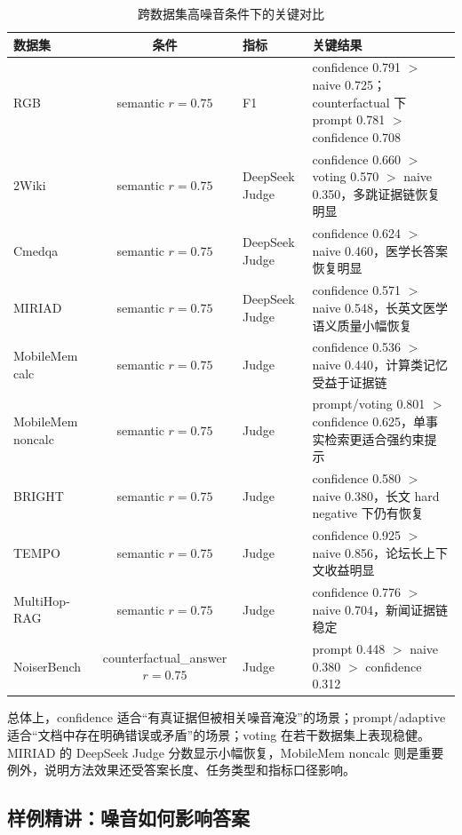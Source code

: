 \documentclass[UTF8,zihao=-4]{ctexart}
\begin{document}
\begin{table}[H]
  \centering
  \caption{跨数据集高噪音条件下的关键对比}
  \label{tab:cross_dataset_summary}
  \small
  \begin{tabularx}{\textwidth}{lclY}
    \toprule
    数据集 & 条件 & 指标 & 关键结果 \\
    \midrule
    RGB & semantic $r=0.75$ & F1 & confidence 0.791 $>$ naive 0.725；counterfactual 下 prompt 0.781 $>$ confidence 0.708 \\
    2Wiki & semantic $r=0.75$ & DeepSeek Judge & confidence 0.660 $>$ voting 0.570 $>$ naive 0.350，多跳证据链恢复明显 \\
    Cmedqa & semantic $r=0.75$ & DeepSeek Judge & confidence 0.624 $>$ naive 0.460，医学长答案恢复明显 \\
    MIRIAD & semantic $r=0.75$ & DeepSeek Judge & confidence 0.571 $>$ naive 0.548，长英文医学语义质量小幅恢复 \\
    MobileMem calc & semantic $r=0.75$ & Judge & confidence 0.536 $>$ naive 0.440，计算类记忆受益于证据链 \\
    MobileMem noncalc & semantic $r=0.75$ & Judge & prompt/voting 0.801 $>$ confidence 0.625，单事实检索更适合强约束提示 \\
    BRIGHT & semantic $r=0.75$ & Judge & confidence 0.580 $>$ naive 0.380，长文 hard negative 下仍有恢复 \\
    TEMPO & semantic $r=0.75$ & Judge & confidence 0.925 $>$ naive 0.856，论坛长上下文收益明显 \\
    MultiHop-RAG & semantic $r=0.75$ & Judge & confidence 0.776 $>$ naive 0.704，新闻证据链稳定 \\
    NoiserBench & counterfactual\_answer $r=0.75$ & Judge & prompt 0.448 $>$ naive 0.380 $>$ confidence 0.312 \\
    \bottomrule
  \end{tabularx}
\end{table}

总体上，confidence 适合“有真证据但被相关噪音淹没”的场景；prompt/adaptive 适合“文档中存在明确错误或矛盾”的场景；voting 在若干数据集上表现稳健。MIRIAD 的 DeepSeek Judge 分数显示小幅恢复，MobileMem noncalc 则是重要例外，说明方法效果还受答案长度、任务类型和指标口径影响。

\subsection{样例精讲：噪音如何影响答案}
\end{document}
